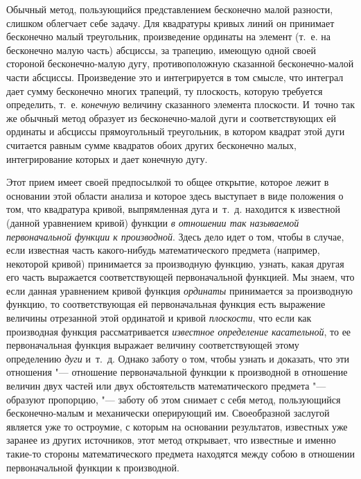 Обычный метод, пользующийся представлением бесконечно малой разности, слишком
облегчает себе задачу. Для квадратуры кривых линий он принимает бесконечно
малый треугольник, произведение ординаты на элемент (т.~е. на бесконечно малую
часть) абсциссы, за трапецию, имеющую одной своей стороной бесконечно-малую
дугу, противоположную сказанной бесконечно-малой части абсциссы. Произведение
это и интегрируется в том смысле, что интеграл дает сумму бесконечно многих
трапеций, ту плоскость, которую требуется определить, т.~е. {\em конечную}
величину сказанного элемента плоскости. И~точно так же обычный метод образует
из бесконечно-малой дуги и соответствующих ей ординаты и абсциссы прямоугольный
треугольник, в котором квадрат этой дуги считается равным сумме квадратов обоих
других бесконечно малых, интегрирование которых и дает конечную дугу.

Этот прием имеет своей предпосылкой то общее открытие, которое лежит в
основании этой области анализа и которое здесь выступает в виде положения о
том, что квадратура кривой, выпрямленная дуга и~т.~д. находится к известной
(данной уравнением кривой) функции {\em в отношении так называемой
первоначальной функции к производной}. Здесь дело идет о том, чтобы в случае,
если известная часть какого-нибудь математического предмета (например,
некоторой кривой) принимается за производную функцию, узнать, какая другая его
часть выражается соответствующей первоначальной функцией. Мы знаем, что если
данная уравнением кривой функция {\em ординаты} принимается за производную
функцию, то соответствующая ей первоначальная функция есть выражение величины
отрезанной этой ординатой и кривой {\em плоскости}, что если как производная
функция рассматривается {\em известное определение касательной}, то ее
первоначальная функция выражает величину соответствующей этому определению
{\em дуги} и~т.~д. Однако заботу о том, чтобы узнать и доказать, что эти
отношения "--- отношение первоначальной функции к производной в отношение
величин двух частей или двух обстоятельств математического предмета "---
образуют пропорцию, "--- заботу об этом снимает с себя метод, пользующийся
бесконечно-малым и механически оперирующий им. Своеобразной заслугой является
уже то остроумие, с которым на основании результатов, известных уже заранее из
других источников, этот метод открывает, что известные и именно такие-то
стороны математического предмета находятся между собою в отношении
первоначальной функции к производной.

